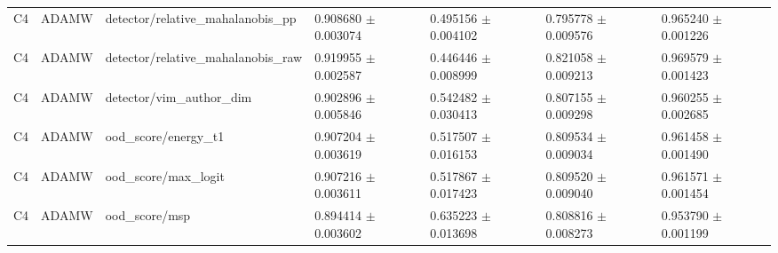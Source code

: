 \begin{longtable}{lllllll}
C4 & ADAMW & detector/relative\_mahalanobis\_pp & 0.908680 $\pm$ 0.003074 & 0.495156 $\pm$ 0.004102 & 0.795778 $\pm$ 0.009576 & 0.965240 $\pm$ 0.001226 \\
C4 & ADAMW & detector/relative\_mahalanobis\_raw & 0.919955 $\pm$ 0.002587 & 0.446446 $\pm$ 0.008999 & 0.821058 $\pm$ 0.009213 & 0.969579 $\pm$ 0.001423 \\
C4 & ADAMW & detector/vim\_author\_dim & 0.902896 $\pm$ 0.005846 & 0.542482 $\pm$ 0.030413 & 0.807155 $\pm$ 0.009298 & 0.960255 $\pm$ 0.002685 \\
C4 & ADAMW & ood\_score/energy\_t1 & 0.907204 $\pm$ 0.003619 & 0.517507 $\pm$ 0.016153 & 0.809534 $\pm$ 0.009034 & 0.961458 $\pm$ 0.001490 \\
C4 & ADAMW & ood\_score/max\_logit & 0.907216 $\pm$ 0.003611 & 0.517867 $\pm$ 0.017423 & 0.809520 $\pm$ 0.009040 & 0.961571 $\pm$ 0.001454 \\
C4 & ADAMW & ood\_score/msp & 0.894414 $\pm$ 0.003602 & 0.635223 $\pm$ 0.013698 & 0.808816 $\pm$ 0.008273 & 0.953790 $\pm$ 0.001199 \\
\end{longtable}
